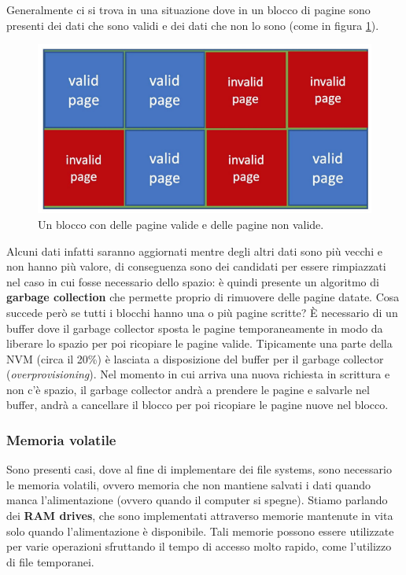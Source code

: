 Generalmente ci si trova in una situazione dove in un blocco di pagine sono presenti dei dati che sono validi e dei dati che non lo sono (come in figura \ref{fig:NAND_block}).
\begin{figure}[h]
    \centering
    \includegraphics[width = .5\textwidth]{../res/imgs/mass memory/NAND_block.png}
    \caption{Un blocco con delle pagine valide e delle pagine non valide.}
    \label{fig:NAND_block}
\end{figure}
Alcuni dati infatti saranno aggiornati mentre degli altri dati sono più vecchi e non hanno più valore, di conseguenza sono dei candidati per essere rimpiazzati nel caso in cui fosse necessario dello spazio: è quindi presente un algoritmo di \textbf{garbage collection} che permette proprio di rimuovere delle pagine datate. Cosa succede però se tutti i blocchi hanno una o più pagine scritte? È necessario di un buffer dove il garbage collector sposta le pagine temporaneamente in modo da liberare lo spazio per poi ricopiare le pagine valide. Tipicamente una parte della NVM (circa il 20\%) è lasciata a disposizione del buffer per il garbage collector (\textit{overprovisioning}). Nel momento in cui arriva una nuova richiesta in scrittura e non c'è spazio, il garbage collector andrà a prendere le pagine e salvarle nel buffer, andrà a cancellare il blocco per poi ricopiare le pagine nuove nel blocco.

% 
\subsubsection{Memoria volatile}
Sono presenti casi, dove al fine di implementare dei file systems, sono necessario le memoria volatili, ovvero memoria che non mantiene salvati i dati quando manca l'alimentazione (ovvero quando il computer si spegne). Stiamo parlando dei \textbf{RAM drives}, che sono implementati attraverso memorie mantenute in vita solo quando l'alimentazione è disponibile. Tali memorie possono essere utilizzate per varie operazioni sfruttando il tempo di accesso molto rapido, come l'utilizzo di file temporanei.

% 
